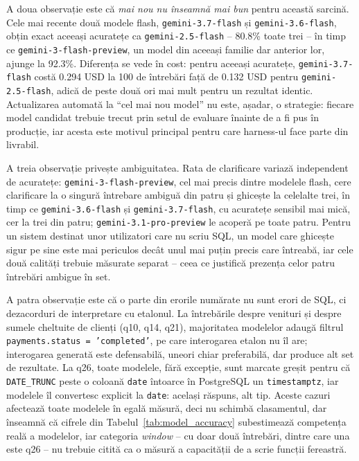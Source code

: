 \documentclass[12pt, a4paper]{report}
\newcommand{\code}[1]{\texttt{#1}}
\begin{document}
A doua observație este că \emph{mai nou nu înseamnă mai bun} pentru această
sarcină. Cele mai recente
două modele flash, \code{gemini-3.7-flash} și \code{gemini-3.6-flash}, obțin
exact aceeași acuratețe ca \code{gemini-2.5-flash} -- 80.8\% toate trei -- în
timp ce \code{gemini-3-flash-preview}, un model din aceeași familie dar
anterior lor, ajunge la 92.3\%. Diferența se vede în cost: pentru aceeași
acuratețe, \code{gemini-3.7-flash} costă 0.294 USD la 100 de întrebări față de
0.132 USD pentru \code{gemini-2.5-flash}, adică de peste două ori mai mult
pentru un rezultat identic. Actualizarea automată la ``cel mai nou model'' nu
este, așadar, o strategie: fiecare model candidat trebuie trecut prin setul de
evaluare înainte de a fi pus în producție, iar acesta este motivul principal
pentru care harness-ul face parte din livrabil.

A treia observație privește ambiguitatea. Rata de clarificare variază
independent de acuratețe: \code{gemini-3-flash-preview},
cel mai precis dintre modelele flash, cere clarificare la o singură întrebare
ambiguă din patru și ghicește la celelalte trei, în timp ce
\code{gemini-3.6-flash} și \code{gemini-3.7-flash}, cu acuratețe sensibil mai
mică, cer la trei din patru; \code{gemini-3.1-pro-preview} le acoperă pe toate
patru. Pentru un sistem destinat unor
utilizatori care nu scriu SQL, un model care ghicește sigur pe sine este mai
periculos decât unul mai puțin precis care întreabă, iar cele două calități
trebuie măsurate separat -- ceea ce justifică prezența celor patru întrebări
ambigue în set.

A patra observație este că o parte din erorile numărate nu sunt erori de SQL, ci
dezacorduri de interpretare cu etalonul. La întrebările despre venituri și
despre sumele cheltuite de clienți (q10, q14, q21), majoritatea modelelor adaugă
filtrul \code{payments.status = 'completed'}, pe care interogarea etalon nu îl
are; interogarea generată este defensabilă, uneori chiar preferabilă, dar
produce alt set de rezultate. La q26, toate modelele, fără excepție, sunt
marcate greșit pentru că \code{DATE\_TRUNC} peste o coloană \code{date} întoarce
în PostgreSQL un \code{timestamptz}, iar modelele îl convertesc explicit la
\code{date}: același răspuns, alt tip. Aceste cazuri afectează toate modelele în
egală măsură, deci nu schimbă clasamentul, dar înseamnă că cifrele din
Tabelul~\ref{tab:model_accuracy} subestimează competența reală a modelelor, iar
categoria \emph{window} -- cu doar două întrebări, dintre care una este q26 --
nu trebuie citită ca o măsură a capacității de a scrie funcții fereastră.
\end{document}
